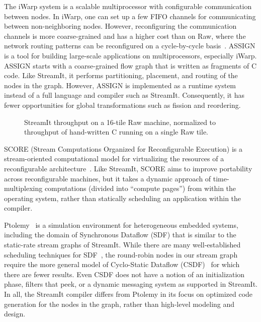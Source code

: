The iWarp system \cite{iwarp} is a scalable multiprocessor with
configurable communication between nodes.  In iWarp, one can set up a
few FIFO channels for communicating between non-neighboring
nodes. However, reconfiguring the communication channels is more
coarse-grained and has a higher cost than on Raw, where the network
routing patterns can be reconfigured on a cycle-by-cycle
basis~\cite{scalaroperands}.  ASSIGN \cite{assign} is a tool for
building large-scale applications on multiprocessors, especially
iWarp.  ASSIGN starts with a coarse-grained flow graph that is written
as fragments of C code.  Like StreamIt, it performs partitioning,
placement, and routing of the nodes in the graph.  However, ASSIGN is
implemented as a runtime system instead of a full language and
compiler such as StreamIt.  Consequently, it has fewer opportunities
for global transformations such as fission and reordering.

\begin{figure}
\centering
\vspace{6pt}
\vspace{-6pt}
\caption{\protect\small StreamIt throughput on a 16-tile Raw machine,
normalized to throughput of hand-written C running on a single Raw
tile.  \protect\label{fig:compare-raw}}
\vspace{-12pt}
\end{figure}

SCORE (Stream Computations Organized for Reconfigurable Execution) is
a stream-oriented computational model for virtualizing the resources
of a reconfigurable architecture~\cite{score}.  Like StreamIt, SCORE
aims to improve portability across reconfigurable machines, but it
takes a dynamic approach of time-multiplexing computations (divided
into ``compute pages'') from within the operating system, rather than
statically scheduling an application within the compiler.

Ptolemy~\cite{ptolemyoverview} is a simulation environment for
heterogeneous embedded systems, including the domain of Synchronous
Dataflow (SDF) that is similar to the static-rate stream graphs of
StreamIt.  While there are many well-established scheduling techniques
for SDF~\cite{leesdf}, the round-robin nodes in our stream graph
require the more general model of Cyclo-Static Dataflow
(CSDF)~\cite{BELP96} for which there are fewer results.  Even CSDF
does not have a notion of an initialization phase, filters that peek,
or a dynamic messaging system as supported in StreamIt.  In all, the
StreamIt compiler differs from Ptolemy in its focus on optimized code
generation for the nodes in the graph, rather than high-level modeling
and design.

